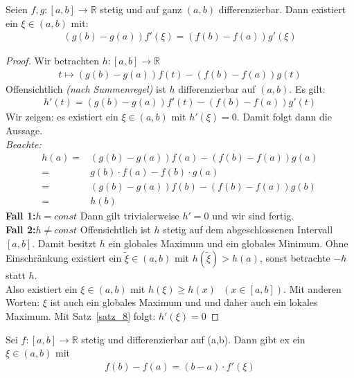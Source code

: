 \begin{Satz}{
	\label{satz_9}
	Seien $f,g : [a,b] \rightarrow \mathbb{R}$ stetig und auf ganz 
	$\left( a, b \right)$ differenzierbar. Dann existiert ein 
	$\xi \in (a,b) $ mit:
	\begin{align*}
		\left( g(b)- g(a)\right)f'(\xi) = 
		\left( f(b) - f(a) \right) g'(\xi)
	\end{align*}
}\end{Satz}

\begin{proof}
	Wir betrachten $h: [a,b] \rightarrow \mathbb{R}$ 
	\begin{align*}
		t \mapsto \left( g(b) -g(a)\right)f(t) - \left(f(b)-f(a)\right)g(t)
	\end{align*}
	Offensichtlich \emph{(nach Summenregel)} ist $h$ differenzierbar auf $(a,b)$.
	Es gilt:
	\begin{align*}
		h'(t) = \left(g(b)-g(a)\right)f'(t) - \left(f(b)-f(a)\right)g'(t)
	\end{align*}
	Wir zeigen: es existiert ein $\xi \in (a,b)$ mit $h'(\xi) = 0$. Damit folgt 
	dann die Aussage. \\
	\emph{Beachte:} 
	\begin{align*}
		h(a) = & \left(g(b)-g(a)\right)f(a) - \left(f(b)-f(a)\right)g(a) \\
		= & g(b) \cdot f(a) - f(b) \cdot g(a) \\
		= & \left(g(b) - g(a)\right)f(b) - \left(f(b)-f(a)\right)g(b) \\
		= & h(b)
	\end{align*}
	\textbf{Fall 1:}$h = const$ Dann gilt trivialerweise $h' = 0$ 
	und wir sind fertig. \\
	\textbf{Fall 2:}$h \neq const$ Offensichtlich ist $h$ stetig auf dem 
	abgeschlossenen Intervall $[a,b]$. Damit besitzt $h$ ein globales Maximum und 
	ein globales Minimum. Ohne Einschränkung existiert ein $\tilde{\xi} \in (a,b)$
	 mit $h(\tilde{\xi}) > h(a)$, sonst betrachte $-h$ statt $h$. \\
	 Also existiert ein $\xi \in (a,b)$ mit $h(\xi) \geq h(x)\textbf{ }
	  (x \in [a,b])$. 
	 Mit anderen Worten: $\xi$ ist auch ein globales Maximum und und daher auch 
	 ein lokales Maximum. Mit Satz~\ref{satz_8}
	 folgt: $h'(\xi) = 0$
	 
\end{proof}
	
\begin{Satz}{\label{vl_07_MWS}
	Sei $f: [a,b] \rightarrow \mathbb{R}$ stetig und differenzierbar auf 
	(a,b). Dann gibt ex ein $\xi \in (a,b)$ mit 
	\begin{align*}
		f(b) -f(a) = (b-a) \cdot f'(\xi)
	\end{align*}
}\end{Satz}

